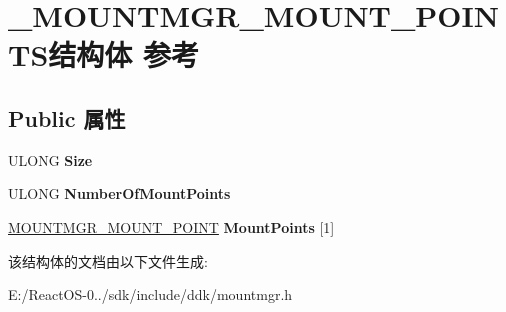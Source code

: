 \hypertarget{struct___m_o_u_n_t_m_g_r___m_o_u_n_t___p_o_i_n_t_s}{}\section{\+\_\+\+M\+O\+U\+N\+T\+M\+G\+R\+\_\+\+M\+O\+U\+N\+T\+\_\+\+P\+O\+I\+N\+T\+S结构体 参考}
\label{struct___m_o_u_n_t_m_g_r___m_o_u_n_t___p_o_i_n_t_s}
\subsection*{Public 属性}
\begin{DoxyCompactItemize}
\item 
\mbox{\label{struct___m_o_u_n_t_m_g_r___m_o_u_n_t___p_o_i_n_t_s_a701e4320b6885e28c7c63d1b4a754979}} 
U\+L\+O\+NG {\bfseries Size}
\item 
\mbox{\label{struct___m_o_u_n_t_m_g_r___m_o_u_n_t___p_o_i_n_t_s_a77f62eaa1d893cb029ba4772c31d3312}} 
U\+L\+O\+NG {\bfseries Number\+Of\+Mount\+Points}
\item 
\mbox{\label{struct___m_o_u_n_t_m_g_r___m_o_u_n_t___p_o_i_n_t_s_a4fac7fdd42faae0e5237565a71665611}} 
\hyperlink{struct___m_o_u_n_t_m_g_r___m_o_u_n_t___p_o_i_n_t}{M\+O\+U\+N\+T\+M\+G\+R\+\_\+\+M\+O\+U\+N\+T\+\_\+\+P\+O\+I\+NT} {\bfseries Mount\+Points} \mbox{[}1\mbox{]}
\end{DoxyCompactItemize}


该结构体的文档由以下文件生成\+:\begin{DoxyCompactItemize}
\item 
E\+:/\+React\+O\+S-\/0../sdk/include/ddk/mountmgr.\+h\end{DoxyCompactItemize}
